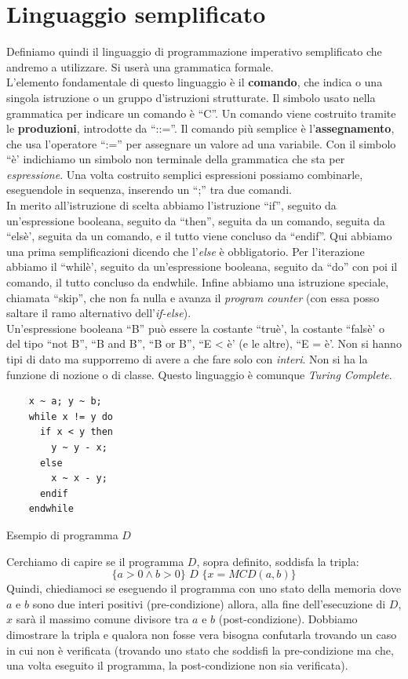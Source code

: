 \section{Linguaggio semplificato}
Definiamo quindi il linguaggio di programmazione imperativo semplificato che
andremo a utilizzare. Si userà una grammatica formale.\\
L'elemento fondamentale di questo linguaggio è il \textbf{comando}, che indica o
una singola istruzione o un gruppo d'istruzioni strutturate. Il simbolo usato
nella grammatica per indicare un comando è ``C''. Un comando viene costruito
tramite le \textbf{produzioni}, introdotte da ``::=''. Il comando più semplice è
l'\textbf{assegnamento}, che usa l'operatore ``:='' per assegnare un valore ad
una variabile. Con il simbolo ``è' indichiamo un simbolo non terminale della
grammatica che sta per \textit{espressione}. Una volta costruito semplici
espressioni possiamo combinarle, eseguendole in sequenza, inserendo un ``;'' tra
due comandi.\\ 
In merito all'istruzione di scelta abbiamo l'istruzione ``if'', seguito da
un'espressione booleana, seguito da ``then'', seguita da un comando, seguita da
``elsè', seguita da un comando, e il tutto viene concluso da ``endif''. Qui
abbiamo una prima semplificazioni dicendo che l'\textit{else} è
obbligatorio. Per l'iterazione abbiamo il ``whilè', seguito da un'espressione
booleana, seguito da ``do'' con poi il comando, il tutto concluso da
endwhile. Infine abbiamo una istruzione speciale, chiamata ``skip'', che non fa
nulla e avanza il \textit{program counter} (con essa posso saltare il ramo
alternativo dell'\textit{if-else}).\\
Un'espressione booleana ``B'' può essere la costante ``truè', la costante
``falsè' o del tipo ``not B'', ``B and B'', ``B or B'', ``E < è' (e le altre),
``E = è'. Non si hanno tipi di dato ma supporremo di avere a che fare solo con
\textit{interi}. Non si ha la funzione di nozione o di classe. Questo linguaggio
è comunque \textit{Turing Complete}.
\begin{listing}[H]
	\begin{lstlisting}
    x ~ a; y ~ b;
    while x != y do
      if x < y then
        y ~ y - x;
      else
        x ~ x - y;
      endif
    endwhile  
	\end{lstlisting}
	\caption{Esempio di programma $D$}
	\label{listing:D}
\end{listing}
Cerchiamo di capire se il programma $D$, sopra definito, soddisfa la tripla:
\[\{a>0\land b>0\}\,\, D\,\, \{x=MCD(a, b)\}\]
Quindi, chiediamoci se eseguendo il programma con uno stato della memoria dove $a$
e $b$ sono due interi positivi (pre-condizione) allora, alla fine dell'esecuzione
di $D$, $x$ sarà il massimo comune divisore tra $a$ e $b$
(post-condizione). Dobbiamo dimostrare la tripla e qualora non fosse vera bisogna
confutarla trovando un caso in cui non è verificata (trovando uno stato che
soddisfi la pre-condizione ma che, una volta eseguito il programma, la post-condizione non 
sia verificata).
